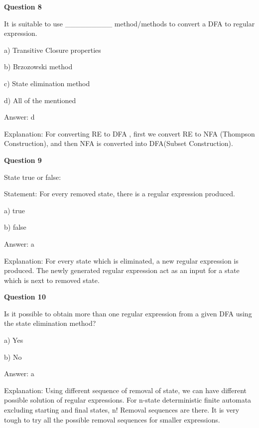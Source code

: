 \documentclass{article}
\begin{document}
\begin{mdframed}[linewidth=1pt, roundcorner=5pt, linecolor=gray!30, backgroundcolor=gray!5]
\textbf{Question 8} 

It is suitable to use \_\_\_\_\_\_\_\_\_ method/methods to convert a DFA to regular expression.

a) Transitive Closure properties

b) Brzozowski method

c) State elimination method

d) All of the mentioned
\vspace{5pt} \par
\begin{tcolorbox}[colback=green!5, colframe=green!40!black, title=Solution]
Answer: d

Explanation: For converting RE to DFA , first we convert RE to NFA (Thompson Construction), and then NFA is converted into DFA(Subset Construction).
\end{tcolorbox}
\end{mdframed}
\newpage

\begin{mdframed}[linewidth=1pt, roundcorner=5pt, linecolor=gray!30, backgroundcolor=gray!5]
\textbf{Question 9} 

State true or false:

Statement: For every removed state, there is a regular expression produced.

a) true

b) false
\vspace{5pt} \par
\begin{tcolorbox}[colback=green!5, colframe=green!40!black, title=Solution]
Answer: a

Explanation: For every state which is eliminated, a new regular expression is produced. The newly generated regular expression act as an input for a state which is next to removed state.
\end{tcolorbox}
\end{mdframed}

\begin{mdframed}[linewidth=1pt, roundcorner=5pt, linecolor=gray!30, backgroundcolor=gray!5]
\textbf{Question 10} 

Is it possible to obtain more than one regular expression from a given DFA using the state elimination method?

a) Yes

b) No
\vspace{5pt} \par
\begin{tcolorbox}[colback=green!5, colframe=green!40!black, title=Solution]
Answer: a

Explanation: Using different sequence of removal of state, we can have different possible solution of regular expressions. For n-state deterministic finite automata excluding starting and final states, n! Removal sequences are there. It is very tough to try all the possible removal sequences for smaller expressions.
\end{tcolorbox}
\end{mdframed}
\newpage
\end{document}

